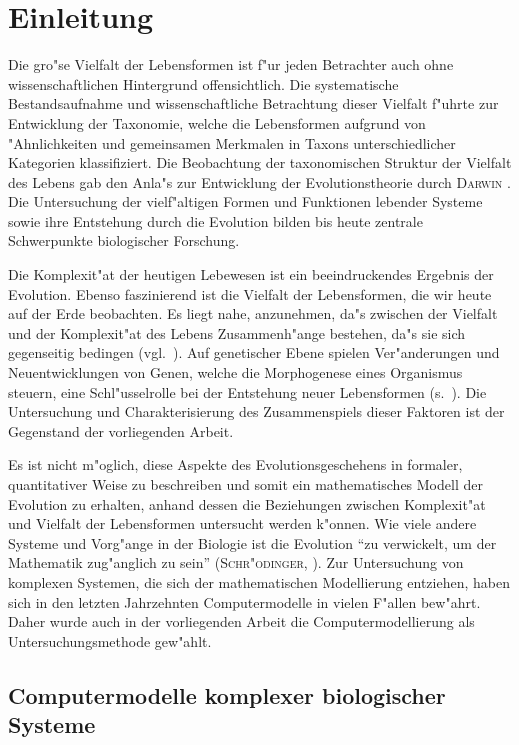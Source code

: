 \chapter{Einleitung}

Die gro"se Vielfalt der Lebensformen ist f"ur jeden Betrachter auch ohne wissenschaftlichen
Hintergrund offensichtlich. Die systematische Bestandsaufnahme und wissenschaftliche Betrachtung
dieser Vielfalt f"uhrte zur Entwicklung der Taxonomie, welche die Lebensformen aufgrund von
"Ahnlichkeiten und gemeinsamen Merkmalen in Taxons unterschiedlicher Kategorien klassifiziert.
Die Beobachtung der taxonomischen Struktur der Vielfalt des Lebens gab den Anla"s zur Entwicklung
der Evolutionstheorie durch \textsc{Darwin} \cite{Darwin}. Die Untersuchung der vielf"altigen Formen und Funktionen lebender
Systeme sowie ihre Entstehung durch die  Evolution bilden bis heute zentrale Schwerpunkte biologischer Forschung.

Die Komplexit"at der heutigen Lebewesen ist ein beeindruckendes Ergebnis der Evolution. Ebenso
faszinierend ist die Vielfalt der Lebensformen, die wir heute auf der Erde beobachten. Es liegt nahe, 
anzunehmen, da"s zwischen der Vielfalt und der Komplexit"at des Lebens Zusammenh"ange bestehen, da"s sie
sich gegenseitig bedingen (vgl.\ \cite{Stanley73}). Auf genetischer Ebene spielen Ver"anderungen und
Neuentwicklungen von Genen, welche die Morphogenese eines Organismus steuern, eine Schl"usselrolle bei
der Entstehung neuer Lebensformen (s.\ \cite{Carroll95,Theissen95}).
Die Untersuchung und Charakterisierung des Zusammenspiels dieser Faktoren
ist der Gegenstand der vorliegenden Arbeit. 

Es ist nicht m"oglich, diese Aspekte des Evolutionsgeschehens in formaler, quantitativer Weise zu beschreiben und somit
ein mathematisches Modell der Evolution zu erhalten, anhand dessen die Beziehungen zwischen Komplexit"at und Vielfalt
der Lebensformen untersucht werden k"onnen. Wie viele andere Systeme und Vorg"ange in der Biologie ist die Evolution
"`zu verwickelt, um der Mathematik zug"anglich zu sein"' (\textsc{Schr"odinger}, \cite{Schroedinger44}). Zur Untersuchung von komplexen
Systemen, die sich der mathematischen Modellierung entziehen, haben sich in den letzten Jahrzehnten Computermodelle
in vielen F"allen bew"ahrt. Daher wurde auch in der vorliegenden Arbeit die Computermodellierung als Untersuchungsmethode
gew"ahlt.


\section{Computermodelle komplexer biologischer \\ Systeme}


